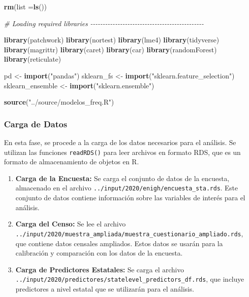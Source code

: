 \documentclass[
  12pt,
]{book}
\newenvironment{Shaded}{\begin{snugshade}}{\end{snugshade}}
\newcommand{\AttributeTok}[1]{\textcolor[rgb]{0.13,0.29,0.53}{#1}}
\newcommand{\CommentTok}[1]{\textcolor[rgb]{0.56,0.35,0.01}{\textit{#1}}}
\newcommand{\FunctionTok}[1]{\textcolor[rgb]{0.13,0.29,0.53}{\textbf{#1}}}
\newcommand{\NormalTok}[1]{#1}
\newcommand{\OtherTok}[1]{\textcolor[rgb]{0.56,0.35,0.01}{#1}}
\newcommand{\StringTok}[1]{\textcolor[rgb]{0.31,0.60,0.02}{#1}}
\begin{document}
\begin{Shaded}
\begin{Highlighting}[]
\FunctionTok{rm}\NormalTok{(}\AttributeTok{list =}\FunctionTok{ls}\NormalTok{())}

\CommentTok{\# Loading required libraries {-}{-}{-}{-}{-}{-}{-}{-}{-}{-}{-}{-}{-}{-}{-}{-}{-}{-}{-}{-}{-}{-}{-}{-}{-}{-}{-}{-}{-}{-}{-}{-}{-}{-}{-}{-}{-}{-}{-}{-}{-}{-}{-}{-}{-}{-}}

\FunctionTok{library}\NormalTok{(patchwork)}
\FunctionTok{library}\NormalTok{(nortest)}
\FunctionTok{library}\NormalTok{(lme4)}
\FunctionTok{library}\NormalTok{(tidyverse)}
\FunctionTok{library}\NormalTok{(magrittr)}
\FunctionTok{library}\NormalTok{(caret)}
\FunctionTok{library}\NormalTok{(car)}
\FunctionTok{library}\NormalTok{(randomForest)}
\FunctionTok{library}\NormalTok{(reticulate)}

\NormalTok{pd }\OtherTok{\textless{}{-}} \FunctionTok{import}\NormalTok{(}\StringTok{"pandas"}\NormalTok{)}
\NormalTok{sklearn\_fs }\OtherTok{\textless{}{-}} \FunctionTok{import}\NormalTok{(}\StringTok{"sklearn.feature\_selection"}\NormalTok{)}
\NormalTok{sklearn\_ensemble }\OtherTok{\textless{}{-}} \FunctionTok{import}\NormalTok{(}\StringTok{"sklearn.ensemble"}\NormalTok{)}

\FunctionTok{source}\NormalTok{(}\StringTok{"../source/modelos\_freq.R"}\NormalTok{)}
\end{Highlighting}
\end{Shaded}

\hypertarget{carga-de-datos-1}{%
\subsubsection*{Carga de Datos}\label{carga-de-datos-1}}

En esta fase, se procede a la carga de los datos necesarios para el análisis. Se utilizan las funciones \texttt{readRDS()} para leer archivos en formato RDS, que es un formato de almacenamiento de objetos en R.

\begin{enumerate}
\def\labelenumi{\arabic{enumi}.}
\item
  \textbf{Carga de la Encuesta:} Se carga el conjunto de datos de la encuesta, almacenado en el archivo \texttt{../input/2020/enigh/encuesta\_sta.rds}. Este conjunto de datos contiene información sobre las variables de interés para el análisis.
\item
  \textbf{Carga del Censo:} Se lee el archivo \texttt{../input/2020/muestra\_ampliada/muestra\_cuestionario\_ampliado.rds}, que contiene datos censales ampliados. Estos datos se usarán para la calibración y comparación con los datos de la encuesta.
\item
  \textbf{Carga de Predictores Estatales:} Se carga el archivo \texttt{../input/2020/predictores/statelevel\_predictors\_df.rds}, que incluye predictores a nivel estatal que se utilizarán para el análisis.
\end{enumerate}
\end{document}
